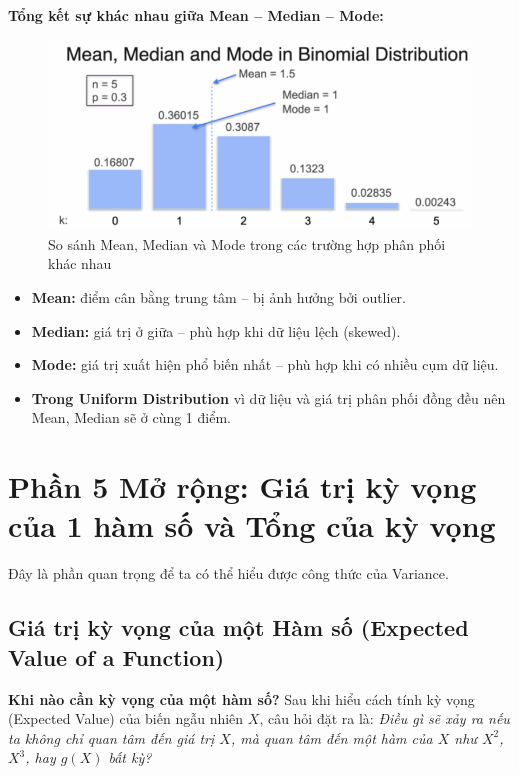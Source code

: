 \documentclass[11pt]{article}
\begin{document}
\vspace{1em}

\textbf{Tổng kết sự khác nhau giữa Mean – Median – Mode:}

\begin{figure}[H]
    \centering
    \includegraphics[width=0.8\linewidth]{images/mean_median_mode_comparison.png}
    \caption{So sánh Mean, Median và Mode trong các trường hợp phân phối khác nhau}
\end{figure}

\begin{itemize}
    \item \textbf{Mean:} điểm cân bằng trung tâm – bị ảnh hưởng bởi outlier.
    \item \textbf{Median:} giá trị ở giữa – phù hợp khi dữ liệu lệch (skewed).
    \item \textbf{Mode:} giá trị xuất hiện phổ biến nhất – phù hợp khi có nhiều cụm dữ liệu.
    \item \textbf{Trong Uniform Distribution} vì dữ liệu và giá trị phân phối đồng đều nên Mean, Median sẽ ở cùng 1 điểm.    \\ 
\end{itemize}

\section{Phần 5 Mở rộng: Giá trị kỳ vọng của 1 hàm số và Tổng của kỳ vọng}
Đây là phần quan trọng để ta có thể hiểu được công thức của Variance. 

\subsection{Giá trị kỳ vọng của một Hàm số (Expected Value of a Function)}
\textbf{Khi nào cần kỳ vọng của một hàm số?}  
Sau khi hiểu cách tính kỳ vọng (Expected Value) của biến ngẫu nhiên $X$, câu hỏi đặt ra là:  
\textit{Điều gì sẽ xảy ra nếu ta không chỉ quan tâm đến giá trị $X$, mà quan tâm đến một hàm của $X$ như $X^2$, $X^3$, hay $g(X)$ bất kỳ?}
\end{document}
